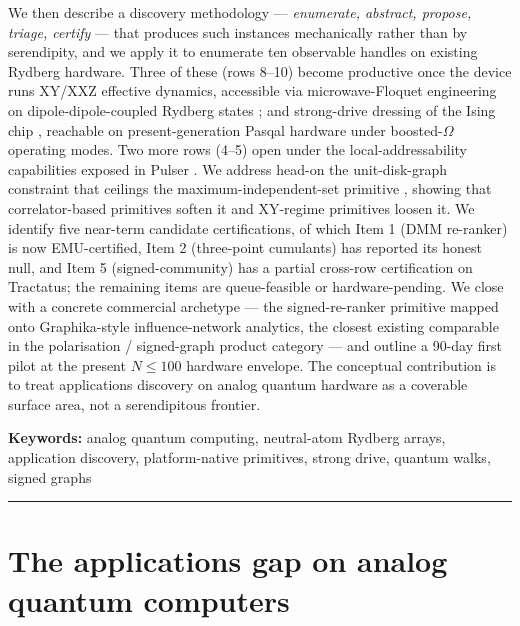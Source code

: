 \documentclass[10pt]{article}
\begin{document}
\begin{center}
\begin{minipage}{0.88\textwidth}
{      We then describe a discovery methodology --- \emph{enumerate, abstract, propose, triage, certify} --- that produces such instances mechanically rather than by serendipity, and we apply it to enumerate ten observable handles on existing Rydberg hardware. Three of these (rows 8--10) become productive once the device runs XY/XXZ effective dynamics, accessible via microwave-Floquet engineering on dipole-dipole-coupled Rydberg states \cite{geier2021floquet,scholl2022microwave,chen2024spectroscopy}; and strong-drive dressing of the Ising chip \cite{ciavarella2022heisenberg}, reachable on present-generation Pasqal hardware under boosted-$\Omega$ operating modes. Two more rows (4--5) open under the local-addressability capabilities exposed in Pulser \cite{silverio2022pulser}. We address head-on the unit-disk-graph constraint that ceilings the maximum-independent-set primitive \cite{ebadi2022quantum,pichler2018quantum,nguyen2023quantum}, showing that correlator-based primitives soften it and XY-regime primitives loosen it. We identify five near-term candidate certifications, of which Item 1 (DMM re-ranker) is now EMU-certified, Item 2 (three-point cumulants) has reported its honest null, and Item 5 (signed-community) has a partial cross-row certification on Tractatus; the remaining items are queue-feasible or hardware-pending. We close with a concrete commercial archetype --- the signed-re-ranker primitive mapped onto Graphika-style influence-network analytics, the closest existing comparable in the polarisation / signed-graph product category --- and outline a 90-day first pilot at the present $N \leq 100$ hardware envelope. The conceptual contribution is to treat applications discovery on analog quantum hardware as a coverable surface area, not a serendipitous frontier.
    }
  \end{minipage}
\end{center}

\vspace{0.6em}
\noindent\textbf{Keywords:} analog quantum computing, neutral-atom Rydberg arrays, application discovery, platform-native primitives, strong drive, quantum walks, signed graphs

\vspace{1em}
\noindent\rule{\textwidth}{0.5pt}
\vspace{1em}

\section{The applications gap on analog quantum computers}\label{sec:gap}
\end{document}
